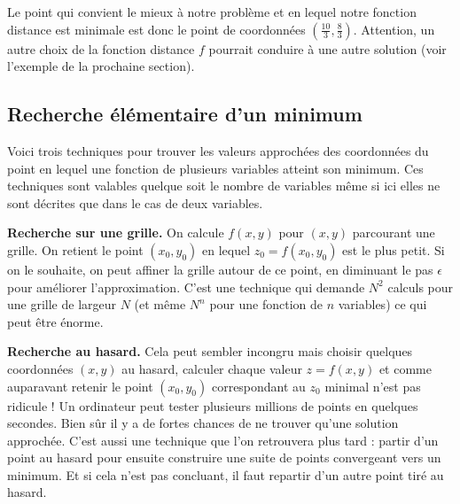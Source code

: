 \documentclass[11pt,class=report,crop=false]{standalone}
\begin{document}
\begin{exemple}

Le point qui convient le mieux à notre problème et en lequel notre fonction distance est minimale est donc le point de coordonnées $(\frac{10}{3},\frac83)$. Attention, un autre choix de la fonction distance $f$ pourrait conduire à une autre solution (voir l'exemple de la prochaine section).



\end{exemple}

\subsection{Recherche élémentaire d'un minimum}


Voici trois techniques pour trouver les valeurs approchées des coordonnées du point en lequel une fonction de plusieurs variables atteint son minimum. Ces techniques sont valables quelque soit le nombre de variables même si ici elles ne sont décrites que dans le cas de deux variables. 

\textbf{Recherche sur une grille.} On calcule $f(x,y)$ pour $(x,y)$ parcourant une grille. On retient le point $(x_0,y_0)$ en lequel $z_0=f(x_0,y_0)$ est le plus petit. Si on le souhaite, on peut affiner la grille autour de ce point, en diminuant le pas $\epsilon$ pour améliorer l'approximation. C'est une technique qui demande $N^2$ calculs pour une grille de largeur $N$ (et même $N^n$ pour une fonction de $n$ variables) ce qui peut être énorme.



\textbf{Recherche au hasard.} Cela peut sembler incongru mais choisir quelques coordonnées $(x,y)$ au hasard, calculer chaque valeur $z=f(x,y)$ et comme auparavant retenir le point $(x_0,y_0)$ correspondant au $z_0$ minimal n'est pas ridicule !
Un ordinateur peut tester plusieurs millions de points en quelques secondes. Bien sûr il y a de fortes chances de ne trouver qu'une solution approchée. C'est aussi une technique que l'on retrouvera plus tard : partir d'un point au hasard pour ensuite construire une suite de points convergeant vers un minimum. Et si cela n'est pas concluant, il faut repartir d'un autre point tiré au hasard.
\end{document}
